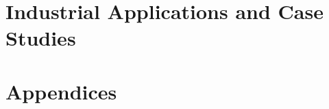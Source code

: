 \documentclass[12pt,a4paper,openany]{book}
\begin{document}
\part{Industrial Applications and Case Studies}








\appendix
\part*{Appendices}








\backmatter


\end{document}
